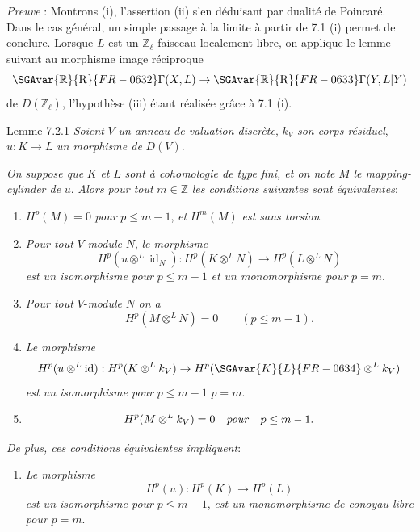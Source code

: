 \emph{Preuve} : Montrons (i), l'assertion (ii) s'en déduisant par dualité de Poincaré. Dans le cas général, un simple passage à la limite à partir de 7.1 (i) permet de conclure. Lorsque $L$ est un $\mathbb{Z}_\ell$-faisceau localement libre, on applique le lemme suivant au morphisme image réciproque
\[
\SGAvar{\mathbb{R}}{\mathrm{R}}{FR-0632}\Gamma(X,L)\to \SGAvar{\mathbb{R}}{\mathrm{R}}{FR-0633}\Gamma(Y,L|Y)
\]
de $D(\mathbb{Z}_\ell)$, l'hypothèse (iii) étant réalisée grâce à 7.1 (i).

\begin{statement}{Lemme 7.2.1}
\emph{Soient} $V$ \emph{un anneau de valuation discrète}, $k_V$ \emph{son corps résiduel}, $u:K\to L$ \emph{un morphisme de} $D(V)$.

\emph{On suppose que} $K$ \emph{et} $L$ \emph{sont à cohomologie de type fini, et on note} $M$ \emph{le mapping-cylinder de} $u$. \emph{Alors pour tout} $m\in\mathbb{Z}$ \emph{les conditions suivantes sont équivalentes}:
\begin{enumerate}[label=(\roman*)]
\item $H^p(M)=0$ \emph{pour} $p\le m-1$, \emph{et} $H^m(M)$ \emph{est sans torsion}.
\item
\emph{Pour tout} $V$-\emph{module} $N$, \emph{le morphisme}
\[
H^p(u\otimes^L\operatorname{id}_N):H^p(K\otimes^L N)\to H^p(L\otimes^L N)
\]
\emph{est un isomorphisme pour} $p\le m-1$ \emph{et un monomorphisme pour} $p=m$.
\item[(ii bis)] \emph{Pour tout} $V$-\emph{module} $N$ \emph{on a}
\[
H^p(M\otimes^L N)=0\qquad(p\le m-1).
\]
\item \emph{Le morphisme}
\[
H^p(u\otimes^L\operatorname{id}):H^p(K\otimes^L k_V)\to H^p(\SGAvar{K}{L}{FR-0634}\otimes^L k_V)
\]
\emph{est un isomorphisme pour} $p\le m-1$  $p=m$.
\item[(iii bis)]
\[
H^p(M\otimes^L k_V)=0\quad\text{\emph{pour}}\quad p\le m-1.
\]
\end{enumerate}
\emph{De plus, ces conditions équivalentes impliquent}:
\begin{enumerate}[label=(\roman* bis)]
\item \emph{Le morphisme}
\[
H^p(u):H^p(K)\to H^p(L)
\]
\emph{est un isomorphisme pour} $p\le m-1$, \emph{est un monomorphisme de conoyau libre pour} $p=m$.
\end{enumerate}
\end{statement}

